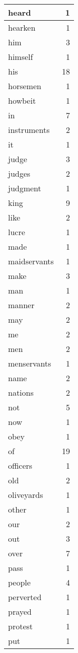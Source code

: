 \begin{center}
\begin{longtable}{l|r}
heard & 1 \\ \hline
hearken & 1 \\ \hline
him & 3 \\ \hline
himself & 1 \\ \hline
his & 18 \\ \hline
horsemen & 1 \\ \hline
howbeit & 1 \\ \hline
in & 7 \\ \hline
instruments & 2 \\ \hline
it & 1 \\ \hline
judge & 3 \\ \hline
judges & 2 \\ \hline
judgment & 1 \\ \hline
king & 9 \\ \hline
like & 2 \\ \hline
lucre & 1 \\ \hline
made & 1 \\ \hline
maidservants & 1 \\ \hline
make & 3 \\ \hline
man & 1 \\ \hline
manner & 2 \\ \hline
may & 2 \\ \hline
me & 2 \\ \hline
men & 2 \\ \hline
menservants & 1 \\ \hline
name & 2 \\ \hline
nations & 2 \\ \hline
not & 5 \\ \hline
now & 1 \\ \hline
obey & 1 \\ \hline
of & 19 \\ \hline
officers & 1 \\ \hline
old & 2 \\ \hline
oliveyards & 1 \\ \hline
other & 1 \\ \hline
our & 2 \\ \hline
out & 3 \\ \hline
over & 7 \\ \hline
pass & 1 \\ \hline
people & 4 \\ \hline
perverted & 1 \\ \hline
prayed & 1 \\ \hline
protest & 1 \\ \hline
put & 1 \\ \hline

\end{longtable}
\end{center}
